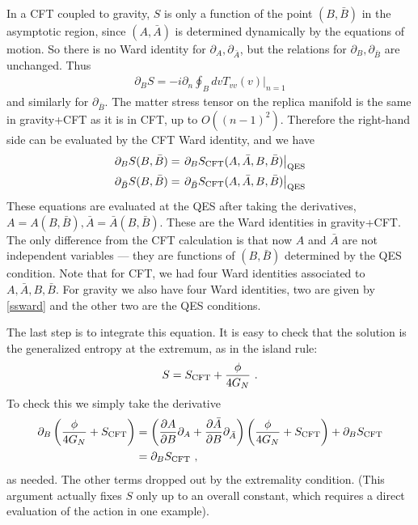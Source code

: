 \documentclass[12pt]{article}
\newcommand{\p}{\partial}
\newcommand{\f}{\frac}
\newcommand{\be}{\begin{equation}}
\newcommand{\ee}{\end{equation}}
\def\be{\begin{eqnarray}}
\def\ee{\end{eqnarray}}
\let\l=\lambda \let\m=\mu \let\n=\nu \let\x=\xi \let\p=\phi \let\r=v
\let\f=\frac
\def\be{\begin{equation}}
\def\ee{\end{equation}}
\renewcommand{\p}{\partial}
\numberwithin{equation}{section}
\def\m{{\mu}}
\def\n{{\nu}}
\def\p{{\phi}}
\newcommand{\bv}{\bar{v}}
\newcommand{\bz}{\bar{z}}
\def\be{\begin{equation}}
\def\ee{\end{equation}}
\def\r{\rightarrow}
\def\f {\frac}
\def\l{\left}
\def\r{\right}
\def\x{\bar{x}}
\def \be {\begin{equation}}
\def \ee {\end{equation}}
\renewcommand{\p}{\partial}
\begin{document}
\begin{spacing}{1.1}
In a CFT coupled to gravity, $S$ is only a function of the point $(B,\bar{B})$ in the asymptotic region, since $(A,\bar{A})$ is determined dynamically by the equations of motion. So there is no Ward identity for $\p_A, \p_{\bar{A}}$, but the relations for $\p_B, \p_{\bar{B}}$ are unchanged. Thus
\begin{align}
\p_B S = -i \p_n \oint_B dv T_{vv}(v)|_{n=1}  
\end{align}
and similarly for $\p_{\bar{B}}$.
The matter stress tensor on the replica manifold is the same in gravity+CFT as it is in CFT, up to $O((n-1)^2)$. Therefore the right-hand side can be evaluated by the CFT Ward identity, and we have
\begin{align}\label{ssward}
\p_B S(B, \bar{B}) &= \left.\p_B S_{\rm CFT}(A,\bar{A}, B, \bar{B})\right|_{\rm QES} \\
\p_{\bar{B}} S(B, \bar{B}) &= \left.\p_{\bar{B}} S_{\rm CFT}(A,\bar{A}, B, \bar{B})\right|_{\rm QES} \notag
\end{align}
These equations are evaluated at the QES after taking the derivatives, $A = A(B,\bar{B}), \bar{A} = \bar{A}(B,\bar{B})$.
These are the Ward identities in gravity+CFT. The only difference from the CFT calculation is that now $A$ and $\bar{A}$ are not independent variables --- they are functions of $(B,\bar{B})$ determined by the QES condition. Note that for CFT, we had four Ward identities associated to $A, \bar{A}, B, \bar{B}$. For gravity we also have four Ward identities, two are given by \eqref{ssward} and the other two are the QES conditions.

The last step is to integrate this equation. It is easy to check that the solution is the generalized entropy at the extremum, as in the island rule:
\be
S = S_{\rm CFT}+\f{\phi}{4G_N}  \  .
\ee
To check this we simply take the derivative
\begin{align}
\p_B \left(\f{\phi}{4G_N}+ S_{\rm CFT} \right) &= 
\l(\frac{\p A}{\p B} \p_A  + \frac{\p\bar{A}}{\p B}\p_{\bar{A}}\r)\l(\f{\phi}{4G_N} + S_{\rm CFT}\r) + 
\p_B S_{\rm CFT}\\
&= \p_B S_{\rm CFT} \ , \notag
\end{align}
as needed.
The other terms dropped out by the extremality condition. (This argument actually fixes $S$ only up to an overall constant, which requires a direct evaluation of the action in one example).



\end{spacing}
\end{document}
